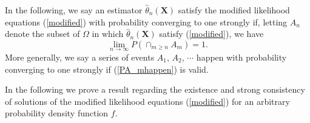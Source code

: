 \documentclass[12pt]{article} %
\newcommand{\bs}{\boldsymbol}
\theoremstyle{definition}
\newtheorem{definition}{Definition}
\begin{document}

In the following, we say an estimator $\hat{\theta}_n(\bs{X})$ satisfy the modified likelihood equations (\ref{modified}) with probability converging to one strongly if, letting $A_n$ denote the subset of $\Omega$ in which $\hat{\theta}_n(\bs{X})$ satisfy (\ref{modified}), we have
\begin{equation}\label{PA_mhappen} \lim_{n\to \infty} P(\cap_{m\geq n} A_m) = 1.
\end{equation}
More generally, we say 
a series of events $A_1$, $A_2$, $\cdots$ happen with probability converging to one strongly if (\ref{PA_mhappen}) is valid.



In the following we prove a result regarding the existence and strong consistency of solutions of the modified likelihood equations (\ref{modified}) for an arbitrary probability density function $f$.
\end{document}
